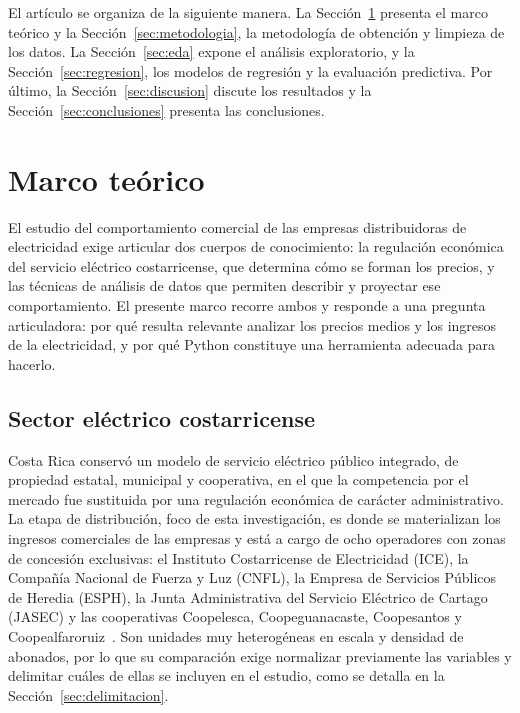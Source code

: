 \documentclass[conference]{IEEEtran}
\begin{document}
El art\'iculo se organiza de la siguiente manera. La Secci\'on~\ref{sec:marco} presenta el marco te\'orico y la Secci\'on~\ref{sec:metodologia}, la metodolog\'ia de obtenci\'on y limpieza de los datos. La Secci\'on~\ref{sec:eda} expone el an\'alisis exploratorio, y la Secci\'on~\ref{sec:regresion}, los modelos de regresi\'on y la evaluaci\'on predictiva. Por \'ultimo, la Secci\'on~\ref{sec:discusion} discute los resultados y la Secci\'on~\ref{sec:conclusiones} presenta las conclusiones.


\section{Marco te\'orico}
\label{sec:marco}
El estudio del comportamiento comercial de las empresas distribuidoras de electricidad exige articular dos cuerpos de conocimiento: la regulaci\'on econ\'omica del servicio el\'ectrico costarricense, que determina c\'omo se forman los precios, y las t\'ecnicas de an\'alisis de datos que permiten describir y proyectar ese comportamiento. El presente marco recorre ambos y responde a una pregunta articuladora: por qu\'e resulta relevante analizar los precios medios y los ingresos de la electricidad, y por qu\'e Python constituye una herramienta adecuada para hacerlo.

\subsection{Sector el\'ectrico costarricense}
\label{sec:electricidadCR}
Costa Rica conserv\'o un modelo de servicio el\'ectrico p\'ublico integrado, de propiedad estatal, municipal y cooperativa, en el que la competencia por el mercado fue sustituida por una regulaci\'on econ\'omica de car\'acter administrativo. La etapa de distribuci\'on, foco de esta investigaci\'on, es donde se materializan los ingresos comerciales de las empresas y est\'a a cargo de ocho operadores con zonas de concesi\'on exclusivas: el Instituto Costarricense de Electricidad (ICE), la Compa\~n\'ia Nacional de Fuerza y Luz (CNFL), la Empresa de Servicios P\'ublicos de Heredia (ESPH), la Junta Administrativa del Servicio El\'ectrico de Cartago (JASEC) y las cooperativas Coopelesca, Coopeguanacaste, Coopesantos y Coopealfaroruiz~\cite{r1}. Son unidades muy heterog\'eneas en escala y densidad de abonados, por lo que su comparaci\'on exige normalizar previamente las variables y delimitar cu\'ales de ellas se incluyen en el estudio, como se detalla en la Secci\'on~\ref{sec:delimitacion}.
\end{document}
